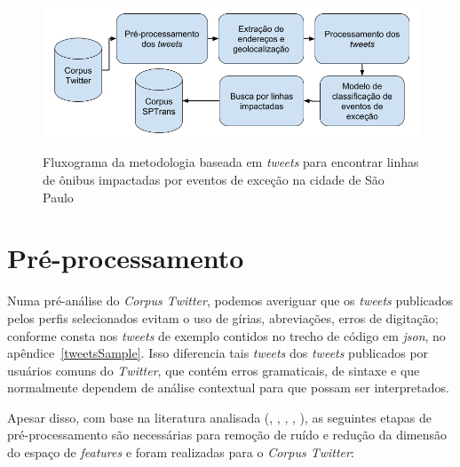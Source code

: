 \documentclass[
	12pt,				%
	oneside,			%
	a4paper,			%
	english,			%
	brazil				%
	]{abntex2ppgsi}
\begin{document}
{{\begin{figure}[!htb]
	\centering
 	  \caption{Fluxograma da metodologia baseada em \textit{tweets} para encontrar linhas de ônibus impactadas por eventos de exceção na cidade de São Paulo}
		\includegraphics[width=0.7\linewidth]{images/tweet_based_methodology_pt.png}
	\label{fig:tweet_based_methodology}
\end{figure}

\section{Pré-processamento}
\label{preprocessing}

Numa pré-análise do \textit{Corpus Twitter}, podemos averiguar que os \textit{tweets} publicados pelos perfis selecionados evitam o uso de gírias, abreviações, erros de digitação; conforme consta nos \textit{tweets} de exemplo contidos no trecho de código em \textit{json}, no apêndice~\ref{tweetsSample}.  Isso diferencia tais \textit{tweets} dos \textit{tweets} publicados por usuários comuns do \textit{Twitter}, que contém erros gramaticais, de sintaxe e que normalmente dependem de análise contextual para que possam ser interpretados.

Apesar disso, com base na literatura analisada (\cite{Steiger2015Census}, \cite{Middleton2014}, \cite{Kobdani2010}, \cite{Setiawan2017},  \cite{Zagal2016}), as seguintes etapas de pré-processamento são necessárias para remoção de ruído e redução da dimensão do espaço de \textit{features} e foram realizadas para o \textit{Corpus Twitter}:

}}
\end{document}
